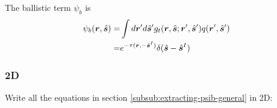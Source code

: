 \documentclass [10pt,letterpaper]{article}
\newcommand{\unitvectorsym}[1]{\hat{\vectorsym{#1}}}
\begin{document}
The ballistic term $\psi_b$ is
\begin{equation} \label{eq:result-psib-general}
	\begin{split}
		\psi_b(\vectorsym{r},\unitvectorsym{s})
		=&
		\int d\vectorsym{r}^\prime d\unitvectorsym{s}^\prime
		g_t(\vectorsym{r},\unitvectorsym{s};\vectorsym{r}^\prime,\unitvectorsym{s}^\prime) 
		q(\vectorsym{r}^\prime,\unitvectorsym{s}^\prime)
		\\
		=&
		e^{-\tau(\vectorsym{r},-\unitvectorsym{s}^I)}
		\delta(\unitvectorsym{s}-\unitvectorsym{s}^I)
	\end{split}
\end{equation}

\subsubsection{2D}
\label{subsub:extracting-psib-2d}
Write all the equations in section \ref{subsub:extracting-psib-general} in 2D:
\end{document}
